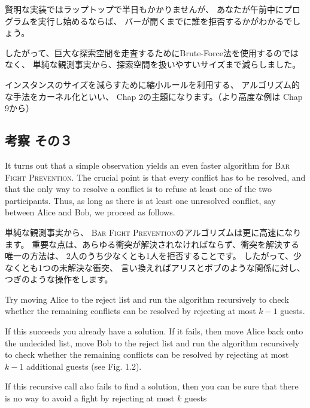 \documentclass{jsarticle}
\begin{document}
賢明な実装ではラップトップで半日もかかりませんが、
あなたが午前中にプログラムを実行し始めるならば、
バーが開くまでに誰を拒否するかがわかるでしょう。

したがって、巨大な探索空間を走査するためにBrute-Force法を使用するのではなく、
単純な観測事実から、探索空間を扱いやすいサイズまで減らしました。

インスタンスのサイズを減らすために縮小ルールを利用する、
アルゴリズム的な手法をカーネル化といい、
Chap 2の主題になります。（より高度な例は Chap 9から）

\subsection{考察 その３}


\begin{screen}

    It turns out that a simple observation yields an even faster algorithm for \textsc{Bar Fight Prevention}. 
    The crucial point is that every conflict has to be resolved, 
    and that the only way to resolve a conflict is 
    to refuse at least one of the two participants. Thus, as long as there is at least one unresolved conflict, 
say between Alice and Bob, we proceed as follows. 

\end{screen}

単純な観測事実から、 \textsc{Bar Fight Prevention}のアルゴリズムは更に高速になります。
重要な点は、あらゆる衝突が解決されなければならず、衝突を解決する唯一の方法は、
2人のうち少なくとも1人を拒否することです。
したがって、少なくとも1つの未解決な衝突、
言い換えればアリスとボブのような関係に対し、つぎのような操作をします。

\newpage

\begin{screen}

    Try moving Alice to the reject list and run the algorithm recursively 
    to check whether the remaining conflicts can be resolved by rejecting at most $k−1$ guests. 
    
    If this succeeds you already have a solution. 
    If it fails, then move Alice back onto the undecided list, 
    move Bob to the reject list and run the algorithm recursively to check whether the remaining conflicts can be resolved by rejecting at most $k−1$ additional guests (see Fig. 1.2). 
    
    If this recursive call also fails to find a solution, then you can be sure that there is no way to avoid a fight by rejecting at most $k$ guests    
\end{screen}
\end{document}
